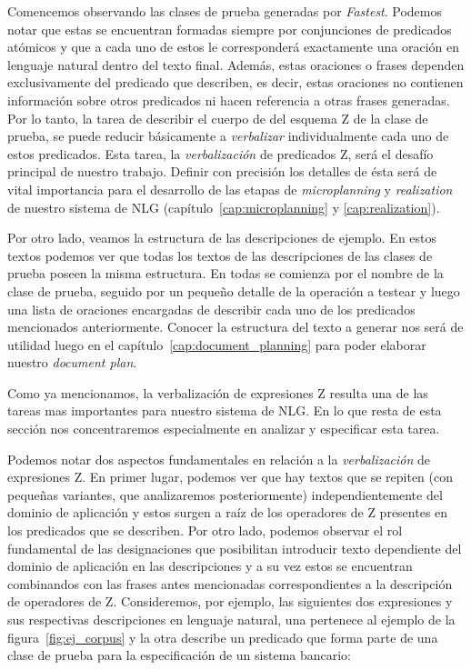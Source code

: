 Comencemos observando las clases de prueba generadas por \emph{Fastest}. Podemos notar que estas se encuentran formadas siempre por conjunciones de predicados atómicos y que a cada uno de estos le corresponderá exactamente una oración en lenguaje natural dentro del texto final. Además, estas oraciones o frases dependen exclusivamente del predicado que describen, es decir, estas oraciones no contienen información sobre otros predicados ni hacen referencia a otras frases generadas. Por lo tanto, la tarea de describir el cuerpo de del esquema Z de la clase de prueba, se puede reducir básicamente a \emph{verbalizar} individualmente cada uno de estos predicados. Esta tarea, la \emph{verbalización} de predicados Z, será el desafío principal de nuestro trabajo. Definir con precisión los detalles de ésta será de vital importancia para el desarrollo de las etapas de \emph{microplanning} y \emph{realization} de nuestro sistema de NLG (capítulo~\ref{cap:microplanning} y \ref{cap:realization}).

Por otro lado, veamos la estructura de las descripciones de ejemplo. En estos textos podemos ver que todas los textos de las descripciones de las clases de prueba poseen la misma estructura. En todas se comienza por el nombre de la clase de prueba, seguido por un pequeño detalle de la operación a testear y luego una lista de oraciones encargadas de describir cada uno de los predicados mencionados anteriormente. Conocer la estructura del texto a generar nos será de utilidad luego en el capítulo~\ref{cap:document_planning} para poder elaborar nuestro \emph{document plan}.

Como ya mencionamos, la verbalización de expresiones Z resulta una de las tareas mas importantes para nuestro sistema de NLG. En lo que resta de esta sección nos concentraremos especialmente en analizar y especificar esta tarea. 

Podemos notar dos aspectos fundamentales en relación a la \emph{verbalización} de expresiones Z. En primer lugar, podemos ver que hay textos que se repiten (con pequeñas variantes, que analizaremos posteriormente) independientemente del dominio de aplicación y estos surgen a raíz de los operadores de Z presentes en los predicados que se describen. Por otro lado, podemos observar el rol fundamental de las designaciones que posibilitan introducir texto dependiente del dominio de aplicación en las descripciones y a su vez estos se encuentran combinandos con las frases antes mencionadas correspondientes a la descripción de operadores de Z. Consideremos, por ejemplo, las siguientes dos expresiones y sus respectivas descripciones en lenguaje natural, una pertenece al ejemplo de la figura~\ref{fig:ej_corpus} y la otra describe un predicado que forma parte de una clase de prueba para la especificación de un sistema bancario:


